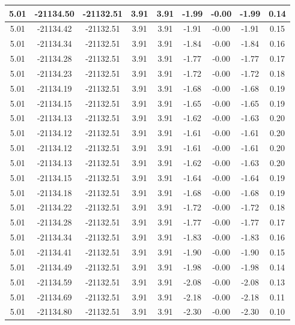 \begin{table}[htbp]
\begin{adjustbox}{angle=90}
\begin{tabular}{|c|c|c|c|c|c|c|c|c|}
 5.01 & -21134.50 & -21132.51 & 3.91 & 3.91 & -1.99 & -0.00 & -1.99 & 0.14\\ \hline
 5.01 & -21134.42 & -21132.51 & 3.91 & 3.91 & -1.91 & -0.00 & -1.91 & 0.15\\ \hline
 5.01 & -21134.34 & -21132.51 & 3.91 & 3.91 & -1.84 & -0.00 & -1.84 & 0.16\\ \hline
 5.01 & -21134.28 & -21132.51 & 3.91 & 3.91 & -1.77 & -0.00 & -1.77 & 0.17\\ \hline
 5.01 & -21134.23 & -21132.51 & 3.91 & 3.91 & -1.72 & -0.00 & -1.72 & 0.18\\ \hline
 5.01 & -21134.19 & -21132.51 & 3.91 & 3.91 & -1.68 & -0.00 & -1.68 & 0.19\\ \hline
 5.01 & -21134.15 & -21132.51 & 3.91 & 3.91 & -1.65 & -0.00 & -1.65 & 0.19\\ \hline
 5.01 & -21134.13 & -21132.51 & 3.91 & 3.91 & -1.62 & -0.00 & -1.63 & 0.20\\ \hline
 5.01 & -21134.12 & -21132.51 & 3.91 & 3.91 & -1.61 & -0.00 & -1.61 & 0.20\\ \hline
 5.01 & -21134.12 & -21132.51 & 3.91 & 3.91 & -1.61 & -0.00 & -1.61 & 0.20\\ \hline
 5.01 & -21134.13 & -21132.51 & 3.91 & 3.91 & -1.62 & -0.00 & -1.63 & 0.20\\ \hline
 5.01 & -21134.15 & -21132.51 & 3.91 & 3.91 & -1.64 & -0.00 & -1.64 & 0.19\\ \hline
 5.01 & -21134.18 & -21132.51 & 3.91 & 3.91 & -1.68 & -0.00 & -1.68 & 0.19\\ \hline
 5.01 & -21134.22 & -21132.51 & 3.91 & 3.91 & -1.72 & -0.00 & -1.72 & 0.18\\ \hline
 5.01 & -21134.28 & -21132.51 & 3.91 & 3.91 & -1.77 & -0.00 & -1.77 & 0.17\\ \hline
 5.01 & -21134.34 & -21132.51 & 3.91 & 3.91 & -1.83 & -0.00 & -1.83 & 0.16\\ \hline
 5.01 & -21134.41 & -21132.51 & 3.91 & 3.91 & -1.90 & -0.00 & -1.90 & 0.15\\ \hline
 5.01 & -21134.49 & -21132.51 & 3.91 & 3.91 & -1.98 & -0.00 & -1.98 & 0.14\\ \hline
 5.01 & -21134.59 & -21132.51 & 3.91 & 3.91 & -2.08 & -0.00 & -2.08 & 0.13\\ \hline
 5.01 & -21134.69 & -21132.51 & 3.91 & 3.91 & -2.18 & -0.00 & -2.18 & 0.11\\ \hline
 5.01 & -21134.80 & -21132.51 & 3.91 & 3.91 & -2.30 & -0.00 & -2.30 & 0.10\\ \hline

\end{tabular}
\end{adjustbox}
\end{table}
